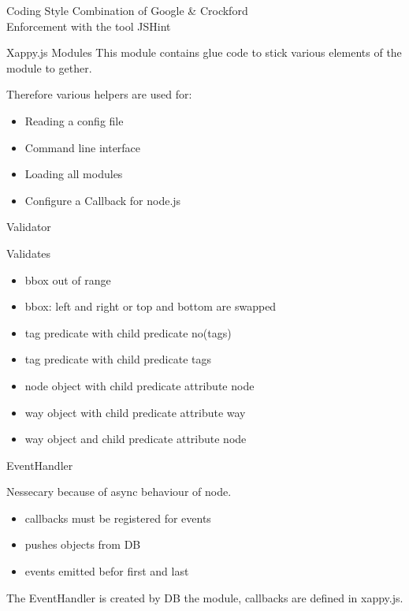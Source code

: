 \documentclass{beamer}
\begin{document}
\begin{frame}{Coding Style}
    \normalsize
    Combination of Google \& Crockford\\
    Enforcement with the tool JSHint
\end{frame}

\begin{frame}{Xappy.js Modules}
    This module contains glue code to stick various elements of the module to gether.

    Therefore various helpers are used for:

    \begin{itemize}
        \item Reading a config file
        \item Command line interface
        \item Loading all modules
        \item Configure a Callback for node.js
    \end{itemize}
\end{frame}

\begin{frame}{Validator}

    \begin{block}{Validates}
        \begin{itemize}
            \item bbox out of range
            \item bbox: left and right or top and bottom are swapped
            \item tag predicate with child predicate no(tags)
            \item tag predicate with child predicate tags
            \item node object with child predicate attribute node
            \item way object with child predicate attribute way
            \item way object and child predicate attribute node
        \end{itemize}
    \end{block}

\end{frame}


\begin{frame}{EventHandler}

    Nessecary because of async behaviour of node.

    \begin{itemize}
        \item callbacks must be registered for events
        \item pushes objects from DB
        \item events emitted befor first and last
    \end{itemize}

    The EventHandler is created by DB the module, callbacks are defined in xappy.js.

\end{frame}
\end{document}
